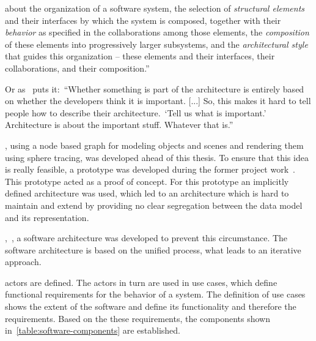 \documentclass[%
    a4paper,    %
    justified,  %
    nobib,      %
    openany     %
]{tufte-book}
\begin{document}
 about the organization of a software system, the selection of
\textit{structural elements} and their interfaces by which the system is
composed, together with their \textit{behavior} as specified in the
collaborations among those elements, the \textit{composition} of these elements
into progressively larger subsystems, and the \textit{architectural style} that
guides this organization -- these elements and their interfaces, their
collaborations, and their composition.''~\cite{kruchten_rup_2003}

Or as~\citeauthor{fowler_architect_2003} puts it:~\enquote{Whether something
is part of the architecture is entirely based on whether the developers think it
is important. [...] So, this makes it hard to tell people how to describe their
architecture.~\enquote{Tell us what is important.} Architecture is about the
important stuff. Whatever that is.}~\cite{fowler_architect_2003}

, using a node based graph for
modeling objects and scenes and rendering them using sphere tracing, was
developed ahead of this thesis. To ensure that this idea is really feasible, a
prototype was developed during the former project
work~. This prototype acted as a proof of
concept. For this prototype an implicitly defined architecture was used, which
led to an architecture which is hard to maintain and extend by providing no
clear segregation between the data model and its representation.

,~, a
software architecture was developed to prevent this circumstance. The software
architecture is based on the unified process, what leads to an iterative
approach.

 actors are defined. The actors in turn are
used in use cases, which define functional requirements for the behavior of a
system. The definition of use cases shows the extent of the software and define
its functionality and therefore the requirements. Based on the these
requirements, the components shown in~\autoref{table:software-components} are
established.
\end{document}
